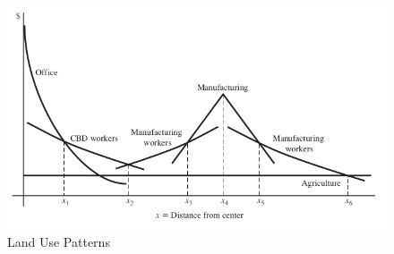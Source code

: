 \documentclass{article}
\begin{document}
\begin{figure}[t]
  \centering
  \includegraphics[width=0.8\linewidth]{images/land-use-patterns.png}
  \caption{Land Use Patterns \citep{OSullivan2011UrbanEconomics}}
  \label{fig:landuse}
\end{figure}
\end{document}
